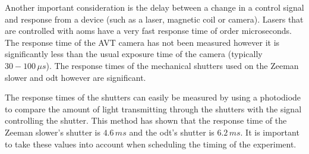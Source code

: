 Another important consideration is the delay between a change in a control signal and response from a device (such as a laser, magnetic coil or camera). Lasers that are controlled with \glspl{aom} have a very fast response time of order microseconds. The response time of the AVT camera has not been measured however it is significantly less than the usual exposure time of the camera (typically $30-100\,\unit{\mu s}$). The response times of the mechanical shutters used on the Zeeman slower and \gls{odt} however are significant.

The response times of the shutters can easily be measured by using a photodiode to compare the amount of light transmitting through the shutters with the signal controlling the shutter. This method has shown that the response time of the Zeeman slower's shutter is $4.6\,\unit{ms}$ and the \gls{odt}'s shutter is $6.2\,\unit{ms}$. It is important to take these values into account when scheduling the timing of the experiment.
